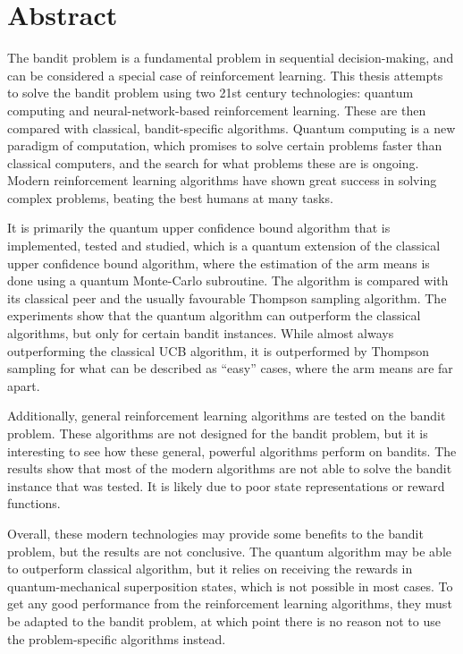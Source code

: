 \chapter{Abstract}

The bandit problem is a fundamental problem in sequential decision-making, and can be considered a special case of reinforcement learning.
This thesis attempts to solve the bandit problem using two 21st century technologies: quantum computing and neural-network-based reinforcement learning.
These are then compared with classical, bandit-specific algorithms.
Quantum computing is a new paradigm of computation, which promises to solve certain problems faster than classical computers, and the search for what problems these are is ongoing.
Modern reinforcement learning algorithms have shown great success in solving complex problems, beating the best humans at many tasks.

It is primarily the quantum upper confidence bound algorithm that is implemented, tested and studied, which is a quantum extension of the classical upper confidence bound algorithm, where the estimation of the arm means is done using a quantum Monte-Carlo subroutine.
The algorithm is compared with its classical peer and the usually favourable Thompson sampling algorithm.
The experiments show that the quantum algorithm can outperform the classical algorithms, but only for certain bandit instances.
While almost always outperforming the classical UCB algorithm, it is outperformed by Thompson sampling for what can be described as \enquote{easy} cases, where the arm means are far apart.

Additionally, general reinforcement learning algorithms are tested on the bandit problem.
These algorithms are not designed for the bandit problem, but it is interesting to see how these general, powerful algorithms perform on bandits.
The results show that most of the modern algorithms are not able to solve the bandit instance that was tested.
It is likely due to poor state representations or reward functions.

Overall, these modern technologies may provide some benefits to the bandit problem, but the results are not conclusive.
The quantum algorithm may be able to outperform classical algorithm, but it relies on receiving the rewards in quantum-mechanical superposition states, which is not possible in most cases.
To get any good performance from the reinforcement learning algorithms, they must be adapted to the bandit problem, at which point there is no reason not to use the problem-specific algorithms instead.



\cleardoublepage